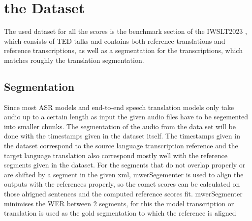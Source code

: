 \chapter{the Dataset}
\label{ch:Dataset}
The used dataset for all the scores is the benchmark section of the IWSLT2023 \cite{sperber2024evaluating}, which consists of TED talks and contains both reference translations and reference transcriptions, as well as a segmentation for the transcriptions, which matches roughly the translation segmentation. 
\section{Segmentation}
\label{sec:FirstContent:Segmentation}
Since most ASR models and end-to-end speech translation models only take audio up to a certain length as input the given audio files have to be segemented into smaller chunks. 
The segmentation of the audio from the data set will be done with the timestamps given in the dataset itself. The timestamps given in the dataset correspond to the source language transcription reference and the target language translation also correspond mostly well with the reference segments given in the dataset. 
For the segments that do not overlap properly or are shifted by a segment in the given xml, mwerSegementer is used to align the outputs with the references properly, so the comet scores can be calculated on those alrigned sentences and the computed reference scores fit. 
mwerSegmenter minimises the WER between 2 segments,  for this the model transcription or translation is used as the gold segmentation to which the reference is aligned 
